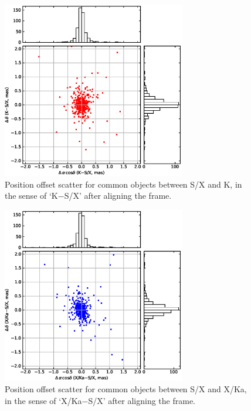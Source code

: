 \documentclass{aa}   %
\begin{document}
\begin{figure}[hbtp]
    \centering
    \includegraphics[width=80mm]{figs/k-sx-scatter-nosys}
    \caption[]{\label{fig:k-sx-scatter-nosys}
        Position offset scatter for common objects between S/X and K, in the sense of `K$-$S/X' after aligning the frame.
    }
\end{figure}

\begin{figure}[hbtp]
    \centering
    \includegraphics[width=80mm]{figs/xka-sx-scatter-nosys}
    \caption[]{\label{fig:xka-sx-scatter-nosys}
        Position offset scatter for common objects between S/X and X/Ka, in the sense of `X/Ka$-$S/X' after aligning the frame.
    }
\end{figure}
\end{document}
